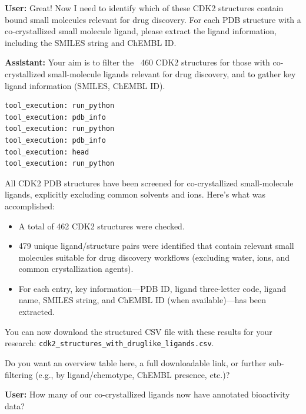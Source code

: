 \documentclass{article}
\begin{document}
\vspace{1.5em}

\begin{userbox}
\textbf{User:} Great! Now I need to identify which of these CDK2 structures contain bound small molecules relevant for drug discovery. For each PDB structure with a co-crystallized small molecule ligand, please extract the ligand information, including the SMILES string and ChEMBL ID.
\end{userbox}

\begin{assistantbox}
\textbf{Assistant:} Your aim is to filter the ~460 CDK2 structures for those with co-crystallized small-molecule ligands relevant for drug discovery, and to gather key ligand information (SMILES, ChEMBL ID).
\begin{verbatim}
tool_execution: run_python
tool_execution: pdb_info
tool_execution: run_python
tool_execution: pdb_info
tool_execution: head
tool_execution: run_python
\end{verbatim}
All CDK2 PDB structures have been screened for co-crystallized small-molecule ligands, explicitly excluding common solvents and ions. Here’s what was accomplished:
\begin{itemize}
    \item A total of 462 CDK2 structures were checked.
    \item 479 unique ligand/structure pairs were identified that contain relevant small molecules suitable for drug discovery workflows (excluding water, ions, and common crystallization agents).
    \item For each entry, key information—PDB ID, ligand three-letter code, ligand name, SMILES string, and ChEMBL ID (when available)—has been extracted.
\end{itemize}
You can now download the structured CSV file with these results for your research: \texttt{cdk2\_structures\_with\_druglike\_ligands.csv}.

Do you want an overview table here, a full downloadable link, or further sub-filtering (e.g., by ligand/chemotype, ChEMBL presence, etc.)?
\end{assistantbox}

\vspace{1.5em}

\begin{userbox}
\textbf{User:} How many of our co-crystallized ligands now have annotated bioactivity data?
\end{userbox}
\end{document}
